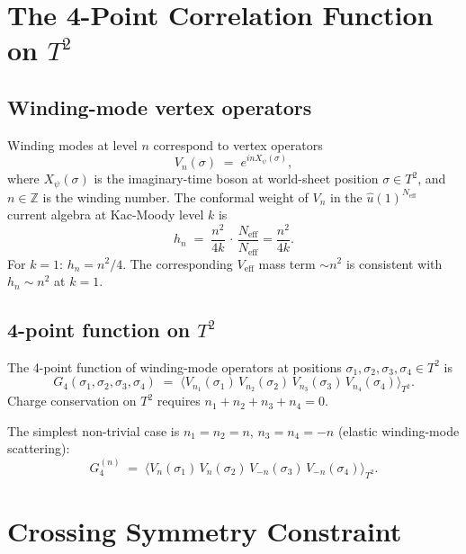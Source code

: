 \documentclass[12pt,a4paper]{article}
\theoremstyle{definition}
\theoremstyle{remark}
\newcommand{\ZZ}{\mathbb{Z}}
\begin{document}
\section{The 4-Point Correlation Function on $T^2$}
\label{sec:4pt}

\subsection{Winding-mode vertex operators}

Winding modes at level $n$ correspond to vertex operators
\[
  V_n(\sigma) \;=\; e^{i n X_\psi(\sigma)},
\]
where $X_\psi(\sigma)$ is the imaginary-time boson at world-sheet position
$\sigma \in T^2$, and $n \in \ZZ$ is the winding number.  The conformal
weight of $V_n$ in the $\hat{u}(1)^{N_{\mathrm{eff}}}$ current algebra at
Kac-Moody level $k$ is
\begin{equation}
\label{eq:confwt}
  h_n \;=\; \frac{n^2}{4k}\,\cdot\,\frac{N_{\mathrm{eff}}}{N_{\mathrm{eff}}} = \frac{n^2}{4k}.
\end{equation}
For $k = 1$: $h_n = n^2/4$.  The corresponding $V_{\mathrm{eff}}$ mass term
$\sim n^2$ is consistent with $h_n \sim n^2$ at $k = 1$.

\subsection{4-point function on $T^2$}

The 4-point function of winding-mode operators at positions
$\sigma_1, \sigma_2, \sigma_3, \sigma_4 \in T^2$ is
\[
  G_4(\sigma_1,\sigma_2,\sigma_3,\sigma_4)
  \;=\;
  \bigl\langle V_{n_1}(\sigma_1)\,V_{n_2}(\sigma_2)\,
              V_{n_3}(\sigma_3)\,V_{n_4}(\sigma_4) \bigr\rangle_{T^2}.
\]
Charge conservation on $T^2$ requires $n_1 + n_2 + n_3 + n_4 = 0$.

The simplest non-trivial case is $n_1 = n_2 = n$, $n_3 = n_4 = -n$
(elastic winding-mode scattering):
\[
  G_4^{(n)}
  \;=\;
  \bigl\langle V_n(\sigma_1)\,V_n(\sigma_2)\,
              V_{-n}(\sigma_3)\,V_{-n}(\sigma_4) \bigr\rangle_{T^2}.
\]

\section{Crossing Symmetry Constraint}
\label{sec:crossing}
\end{document}
